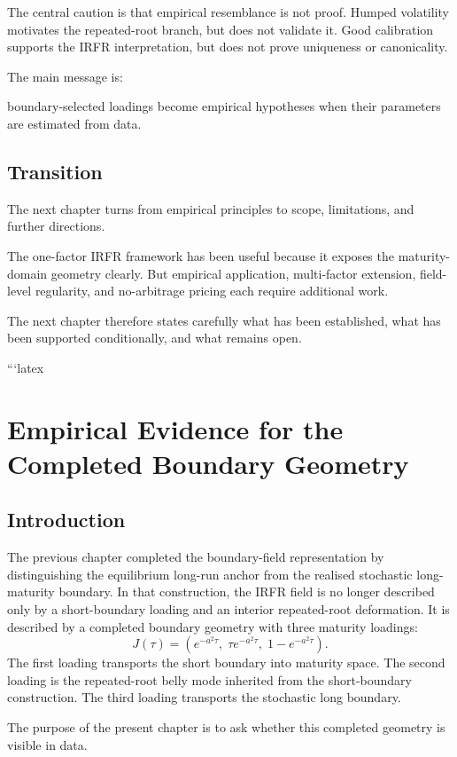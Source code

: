 \documentclass[11pt,oneside]{book}
\begin{document}
The central caution is that empirical resemblance is not proof. Humped
volatility motivates the repeated-root branch, but does not validate it.
Good calibration supports the IRFR interpretation, but does not prove
uniqueness or canonicality.

The main message is:

boundary-selected loadings become empirical hypotheses when their
parameters are estimated from data.

\section{Transition}\label{transition-1}

The next chapter turns from empirical principles to scope, limitations,
and further directions.

The one-factor IRFR framework has been useful because it exposes the
maturity-domain geometry clearly. But empirical application,
multi-factor extension, field-level regularity, and no-arbitrage pricing
each require additional work.

The next chapter therefore states carefully what has been established,
what has been supported conditionally, and what remains open.

```latex
\chapter{Empirical Evidence for the Completed Boundary Geometry}

\section{Introduction}

The previous chapter completed the boundary-field representation by distinguishing the equilibrium long-run anchor from the realised stochastic long-maturity boundary. In that construction, the IRFR field is no longer described only by a short-boundary loading and an interior repeated-root deformation. It is described by a completed boundary geometry with three maturity loadings:
\[
J(\tau)
=
\left(
e^{-a^2\tau},
\;
\tau e^{-a^2\tau},
\;
1-e^{-a^2\tau}
\right).
\]
The first loading transports the short boundary into maturity space. The second loading is the repeated-root belly mode inherited from the short-boundary construction. The third loading transports the stochastic long boundary.

The purpose of the present chapter is to ask whether this completed geometry is visible in data.
\end{document}
